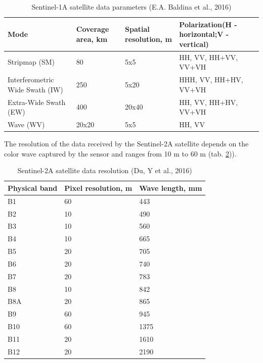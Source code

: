 	{\setlength{\extrarowheight}{15pt}%
	\begin{table}[H]
		\begin{center}
			\caption{Sentinel-1A satellite data parameters (E.A. Baldina et al., 2016)}
			\label{tab:sent-char}
			\begin{tabularx}{\textwidth}{|X|X|X|X|}
				\hline
				\textbf{Mode} & \textbf{Coverage area, km} & \textbf{Spatial resolution, m} & \textbf{Polarization\newline(H - horizontal;\newline V - vertical)}\\
				\hline
				Stripmap (SM) & 80 & 5x5 & HH, VV, HH+VV, VV+VH \\
				\hline
				Interferometric Wide Swath (IW) & 250 & 5x20 & HHH, VV, HH+HV, VV+VH \\
				\hline
				Extra-Wide Swath (EW) & 400 & 20x40 & HH, VV, HH+HV, VV+VH \\
				\hline
				Wave (WV) & 20x20 & 5x5 & HH, VV \\
				\hline
			\end{tabularx}
		\end{center}
	\end{table}

	The resolution of the data received by the Sentinel-2A satellite depends on the color wave captured by the sensor and ranges from 10 m to 60 m (tab. \ref{tab:sent-res})).
	
	{\setlength{\extrarowheight}{15pt}%
	\begin{table}[H]
		\begin{center}
			\caption{Sentinel-2A satellite data resolution (Du, Y et al., 2016)}
			\label{tab:sent-res}
			\begin{tabularx}{\textwidth}{|X|X|X|}
				\hline
				\textbf{Physical band} & \textbf{Pixel resolution, m} & \textbf{Wave length, mm}\\
				\hline
				B1 & 60 & 443 \\
				\hline
				B2 & 10 & 490 \\
				\hline
				B3 & 10 & 560 \\
				\hline
				B4 & 10 & 665 \\
				\hline
				B5 & 20 & 705 \\
				\hline
				B6 & 20 & 740 \\
				\hline
				B7 & 20 & 783 \\
				\hline
				B8 & 10 & 842 \\
				\hline
				B8A & 20 & 865 \\
				\hline
				B9 & 60 & 945 \\
				\hline
				B10 & 60 & 1375 \\
				\hline
				B11 & 20 & 1610 \\
				\hline
				B12 & 20 & 2190 \\
				\hline
			\end{tabularx}
		\end{center}
	\end{table}
		
}}
